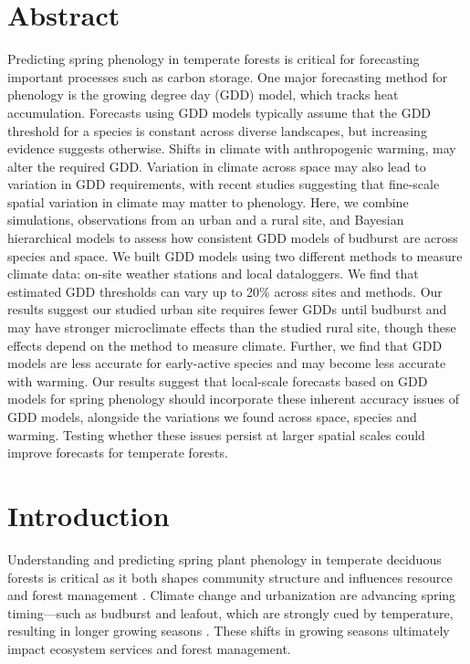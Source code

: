 \documentclass{article}\usepackage[]{graphicx}\usepackage[]{color}
\newcommand{\R}[1]{\label{#1}\linelabel{#1}}
\begin{document}
\section*{Abstract} 
Predicting spring phenology in temperate forests is critical for forecasting important processes such as carbon storage. One major forecasting method for phenology is the growing degree day (GDD) model, which tracks heat accumulation. Forecasts using GDD models typically assume that the GDD threshold for a species is constant across diverse landscapes, but increasing evidence suggests otherwise. Shifts in climate with anthropogenic warming, may alter the required GDD. Variation in climate across space may also lead to variation in GDD requirements, with recent studies suggesting that fine-scale spatial variation in climate may matter to phenology. Here, we combine simulations, observations from an urban and a rural site, and Bayesian hierarchical models to assess how consistent GDD models of budburst are across species and space. We built GDD models using two different methods to measure climate data: on-site weather stations and local dataloggers. We find that estimated GDD thresholds can vary up to 20\% across sites and methods. Our results suggest our studied urban site requires fewer GDDs until budburst and may have stronger microclimate effects than the studied rural site, though these effects depend on the method to measure climate. Further, we find that GDD models are less accurate for early-active species and may become less accurate with warming. Our results suggest that local-scale forecasts based on GDD models for spring phenology should incorporate these inherent accuracy issues of GDD models, alongside the variations we found across space, species and warming. Testing whether these issues persist at larger spatial scales could improve forecasts for temperate forests.  

\section{Introduction}

\R{Z3ecosys}Understanding and predicting spring plant phenology in temperate deciduous forests is critical as it both shapes community structure and influences resource and forest management \citep{Morellato2016,Silvestro2019}. Climate change and urbanization are advancing spring timing---such as budburst and leafout, which are strongly cued by temperature, resulting in longer growing seasons \citep{Chuine2001}. These shifts in growing seasons ultimately impact ecosystem services and forest management.\R{Z3ecosysend}
 
\end{document}
